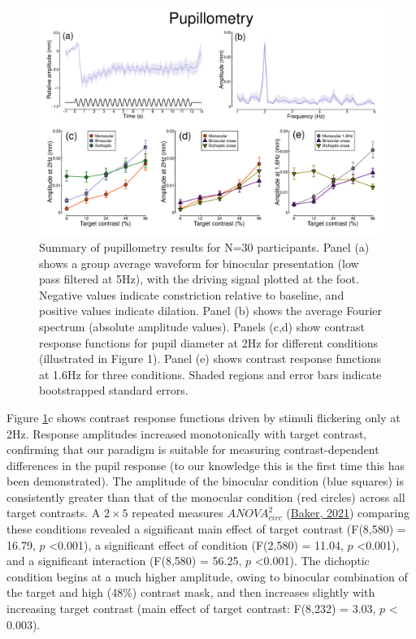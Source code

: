 \documentclass[
]{article}
\begin{document}
\begin{figure}

{\centering \includegraphics{Figures/pupildata} 

}

\caption{Summary of pupillometry results for N=30 participants. Panel (a) shows a group average waveform for binocular presentation (low pass filtered at 5Hz), with the driving signal plotted at the foot. Negative values indicate constriction relative to baseline, and positive values indicate dilation. Panel (b) shows the average Fourier spectrum (absolute amplitude values). Panels (c,d) show contrast response functions for pupil diameter at 2Hz for different conditions (illustrated in Figure 1). Panel (e) shows contrast response functions at 1.6Hz for three conditions. Shaded regions and error bars indicate bootstrapped standard errors.}\label{fig:pupildata}
\end{figure}

Figure \ref{fig:pupildata}c shows contrast response functions driven by stimuli flickering only at 2Hz. Response amplitudes increased monotonically with target contrast, confirming that our paradigm is suitable for measuring contrast-dependent differences in the pupil response (to our knowledge this is the first time this has been demonstrated). The amplitude of the binocular condition (blue squares) is consistently greater than that of the monocular condition (red circles) across all target contrasts. A \(2\times5\) repeated measures \(ANOVA^2_{circ}\) (\protect\hyperlink{ref-Baker2021}{Baker, 2021}) comparing these conditions revealed a significant main effect of target contrast (F(8,580) = 16.79, \(p\) \textless0.001), a significant effect of condition (F(2,580) = 11.04, \(p\) \textless0.001), and a significant interaction (F(8,580) = 56.25, \(p\) \textless0.001). The dichoptic condition begins at a much higher amplitude, owing to binocular combination of the target and high (48\%) contrast mask, and then increases slightly with increasing target contrast (main effect of target contrast: F(8,232) = 3.03, \(p\) \textless{} 0.003).
\end{document}

